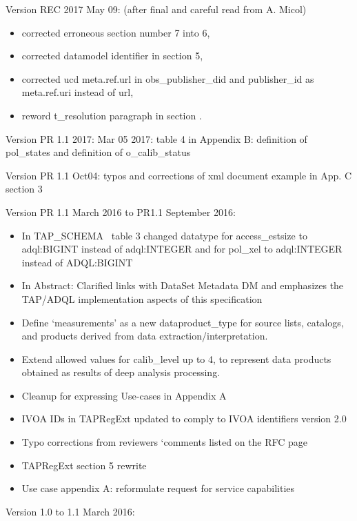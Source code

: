 \documentclass[11pt,a4paper]{ivoa}
\begin{document}
Version REC 2017 May 09: (after final and careful read from A. Micol)

\begin{itemize}
\item corrected erroneous section number 7 into 6,
\item corrected  datamodel identifier in section 5,
\item corrected ucd meta.ref.url in obs\_publisher\_did and publisher\_id  as meta.ref.uri instead of url,
\item reword t\_resolution paragraph in section .
\end{itemize}

Version PR 1.1 2017: Mar 05 2017: table 4 in Appendix B: definition of pol\_states and definition of o\_calib\_status

Version PR 1.1 Oct04: typos and corrections of xml document example in App. C section 3

Version PR 1.1 March 2016 to PR1.1 September 2016:

\begin{itemize}
\item In TAP\_SCHEMA~ table 3 changed datatype for access\_estsize to adql:BIGINT instead of adql:INTEGER and for
pol\_xel to adql:INTEGER instead of ADQL:BIGINT
\item In Abstract: Clarified links with DataSet Metadata DM and emphasizes the TAP/ADQL implementation aspects of this
specification
\item Define `measurements' as a new dataproduct\_type for source lists, catalogs, and products derived from data
extraction/interpretation.
\item Extend allowed values for calib\_level up to 4, to represent data products obtained as results of deep analysis
processing.
\item Cleanup for expressing Use-cases in Appendix A
\item IVOA IDs in TAPRegExt updated to comply to IVOA identifiers version 2.0
\item Typo corrections from reviewers `comments listed on the RFC page
\item TAPRegExt section 5 rewrite
\item Use case appendix A: reformulate request for service capabilities
\end{itemize}
Version 1.0 to 1.1 March 2016:
\end{document}
